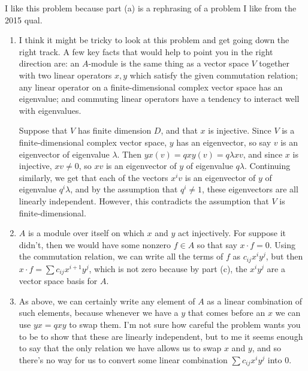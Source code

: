 \begin{solution}
I like this problem because part (a) is a rephrasing of a problem I like from the 2015 qual.
\begin{enumerate}
    \item I think it might be tricky to look at this problem and get going down the right track. A few key facts that would help to point you in the right direction are: an $A$-module is the same thing as a vector space $V$ together with two linear operators $x,y$ which satisfy the given commutation relation; any linear operator on a finite-dimensional complex vector space has an eigenvalue; and commuting linear operators have a tendency to interact well with eigenvalues.
    
    Suppose that $V$ has finite dimension $D$, and that $x$ is injective. Since $V$ is a finite-dimensional complex vector space, $y$ has an eigenvector, so say $v$ is an eigenvector of eigenvalue $\lambda$. Then $yx(v) = qxy(v) = q\lambda xv$, and since $x$ is injective, $xv \neq 0$, so $xv$ is an eigenvector of $y$ of eigenvalue $q \lambda$. Continuing similarly, we get that each of the vectors $x^i v$ is an eigenvector of $y$ of eigenvalue $q^i \lambda$, and by the assumption that $q^i \neq 1$, these eigenvectors are all linearly independent. However, this contradicts the assumption that $V$ is finite-dimensional.
    \item $A$ is a module over itself on which $x$ and $y$ act injectively. For suppose it didn't, then we would have some nonzero $f \in A$ so that say $x \cdot f = 0$. Using the commutation relation, we can write all the terms of $f$ as $c_{ij} x^i y^j$, but then $x \cdot f = \sum c_{ij} x^{i+1} y^j$, which is not zero because by part (c), the $x^i y^j$ are a vector space basis for $A$.
    \item As above, we can certainly write any element of $A$ as a linear combination of such elements, because whenever we have a $y$ that comes before an $x$ we can use $yx = qxy$ to swap them. I'm not sure how careful the problem wants you to be to show that these are linearly independent, but to me it seems enough to say that the only relation we have allows us to swap $x$ and $y$, and so there's no way for us to convert some linear combination $\sum c_{ij} x^i y^j$ into 0.
\end{enumerate}
\end{solution}

